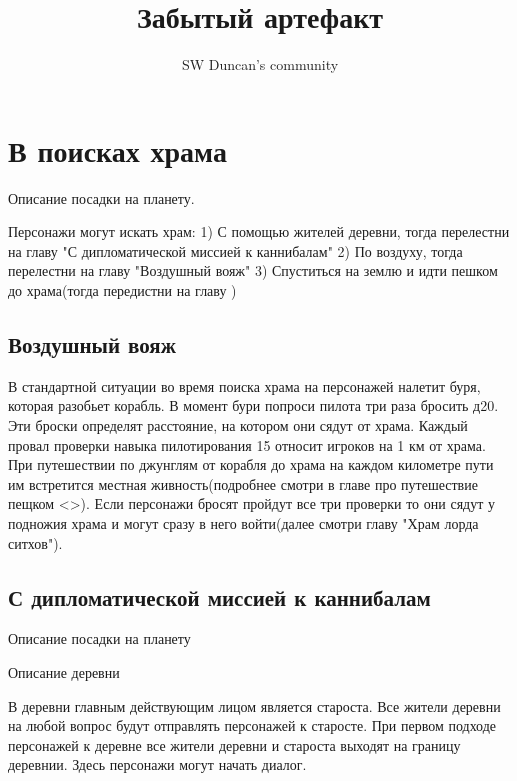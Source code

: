 \documentclass{article}
\title{Забытый артефакт}
\author{SW Duncan's community}
\begin{document}
\pagecolor{sky_black}
\BgThispage
\maketitle %
\newpage
\tableofcontents %
\newpage
\section{В поисках храма}

Описание посадки на планету.
\begin{myquote}
\color{sw}

\end{myquote}
Персонажи могут искать храм:
1) С помощью жителей деревни, тогда перелестни на главу "С дипломатической миссией к каннибалам"
2) По воздуху, тогда перелестни на главу "Воздушный вояж"
3) Спуститься на землю и идти пешком до храма(тогда передистни на главу )
\subsection{Воздушный вояж}
В стандартной ситуации во время поиска храма на персонажей налетит буря, которая разобьет корабль.
В момент бури попроси пилота три раза бросить д20. Эти броски определят расстояние, на котором они сядут от храма.
Каждый провал проверки навыка пилотирования 15 относит игроков на 1 км от храма. При путешествии по джунглям от корабля до храма на каждом километре пути им встретится местная живность(подробнее смотри в главе про путешествие пещком <>). Если персонажи бросят пройдут все три проверки то они сядут у подножия храма и могут сразу в него войти(далее смотри главу "Храм лорда ситхов").

\begin{myquote}
\color{sw}

\end{myquote}
\subsection{С дипломатической миссией к каннибалам}
Описание посадки на планету
\begin{myquote}
\color{sw}

\end{myquote}

Описание деревни
\begin{myquote}
\color{sw}

\end{myquote}
В деревни главным действующим лицом является староста. Все жители деревни на любой вопрос будут отправлять персонажей к старосте. При первом подходе персонажей к деревне все жители деревни и староста выходят на границу деревнии. Здесь персонажи могут начать диалог.
\end{document}
